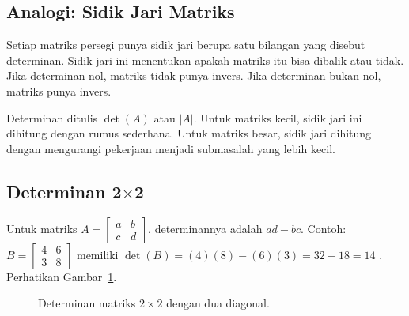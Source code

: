 \documentclass[11pt,a4paper]{article}
\begin{document}
\subsection{Analogi: Sidik Jari Matriks}

Setiap matriks persegi punya sidik jari berupa satu bilangan yang disebut determinan. Sidik jari ini menentukan apakah matriks itu bisa dibalik atau tidak. Jika determinan nol, matriks tidak punya invers. Jika determinan bukan nol, matriks punya invers.

Determinan ditulis $\det(A)$ atau $|A|$. Untuk matriks kecil, sidik jari ini dihitung dengan rumus sederhana. Untuk matriks besar, sidik jari dihitung dengan mengurangi pekerjaan menjadi submasalah yang lebih kecil.

\subsection{Determinan 2$\times$2}

Untuk matriks $A=\begin{bmatrix}a&b\\c&d\end{bmatrix}$, determinannya adalah $ad-bc$. Contoh: $B=\begin{bmatrix}4&6\\3&8\end{bmatrix}$ memiliki $\det(B)=(4)(8)-(6)(3)=32-18=14$ \cite{anton}. Perhatikan Gambar~\ref{fig:determinan-2x2}.

\begin{figure}[H]
	\centering
	\caption{Determinan matriks $2 \times 2$ dengan dua diagonal.}
	\label{fig:determinan-2x2}
\end{figure}
\end{document}

